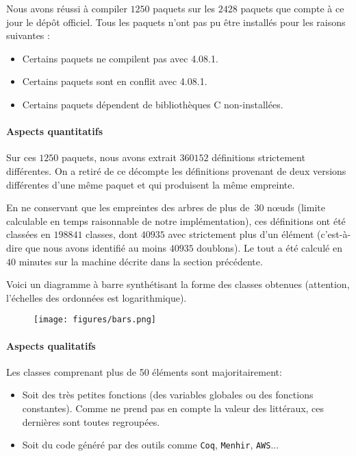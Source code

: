 Nous avons réussi à compiler $1250$ paquets sur les $2428$ paquets que
compte à ce jour le dépôt {\Opam} officiel. Tous les paquets n'ont pas
pu être installés pour les raisons suivantes :

\begin{itemize}
\item Certains paquets ne compilent pas avec {\OCaml} 4.08.1.
\item Certains paquets sont en conflit avec {\OCaml} 4.08.1.
\item Certains paquets dépendent de bibliothèques C non-installées.
\end{itemize}

\paragraph{Aspects quantitatifs}

Sur ces $1250$ paquets, nous avons extrait $360152$ définitions
strictement différentes. On a retiré de ce décompte les définitions
provenant de deux versions différentes d'une même paquet et qui
produisent la même empreinte.

En ne conservant que les empreintes des arbres de plus de~$30$ nœuds
(limite calculable en temps raisonnable de notre implémentation), ces
définitions ont été classées en $198841$ classes, dont $40935$ avec
strictement plus d'un élément (c'est-à-dire que nous avons identifié
au moins $40935$ doublons). Le tout a été calculé en $40$ minutes sur
la machine décrite dans la section précédente.

Voici un diagramme à barre synthétisant la forme des classes obtenues (attention, l'échelles des ordonnées est logarithmique).

\begin{figure}[h]
	\texttt{[image: figures/bars.png]}
\end{figure}

\paragraph{Aspects qualitatifs}

Les classes comprenant plus de 50 éléments sont majoritairement:
\begin{itemize}
\item Soit des très petites fonctions (des variables globales ou des fonctions constantes). Comme {\Asak} ne prend pas en compte la valeur des littéraux, ces dernières sont toutes regroupées.
\item Soit du code généré par des outils comme \verb|Coq|, \verb|Menhir|, \verb|AWS|...
\end{itemize}

